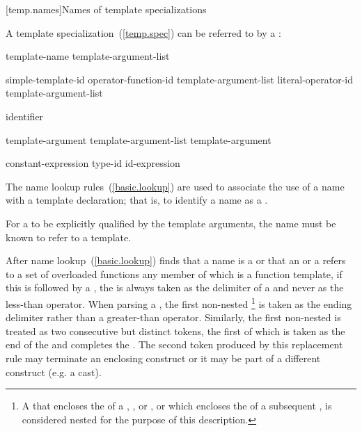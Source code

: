[temp.names]{Names of template specializations}

\pnum
A template specialization~(\ref{temp.spec}) can be referred to by a
:

\begin{bnf}
\br
  template-name \terminal{<} template-argument-list\opt \terminal{>}
\end{bnf}

\begin{bnf}
\br
  simple-template-id\br
  operator-function-id \terminal{<} template-argument-list\opt \terminal{>}\br
  literal-operator-id \terminal{<} template-argument-list\opt \terminal{>}
\end{bnf}

\begin{bnf}
\br
  identifier
\end{bnf}

\begin{bnf}
\br
  template-argument \opt\br
  template-argument-list \terminal{,} template-argument \opt
\end{bnf}

\begin{bnf}
\br
  constant-expression\br
  type-id\br
  id-expression
\end{bnf}

\enternote
The name lookup rules~(\ref{basic.lookup}) are used to associate the use of
a name with a template declaration;
that is, to identify a name as a
.
\exitnote

\pnum
For a
to be explicitly qualified by the template arguments,
the name must be known to refer to a template.

\pnum
{}%
After name lookup~(\ref{basic.lookup}) finds that a name is a
or that an  or a  refers to a set of
overloaded functions any member of which is a function template,
if this is followed by a
\tcode{<},
the
\tcode{<}
is always taken as the delimiter of a
and never as the less-than operator.
When parsing a ,
the first non-nested
\tcode{>}\footnote{A \tcode{>} that encloses the 
of a , , 
or , or which encloses the 
of a subsequent , is considered nested for the purpose
of this description.
}
is taken as the ending delimiter
rather than a greater-than operator.
Similarly, the first non-nested \tcode{>{>}} is treated as two
consecutive but distinct \tcode{>} tokens, the first of which is taken
as the end of the  and completes
the . \enternote The second \tcode{>}
token produced by this replacement rule may terminate an enclosing
 construct or it may be part of a different
construct (e.g. a cast).\exitnote
\enterexample

